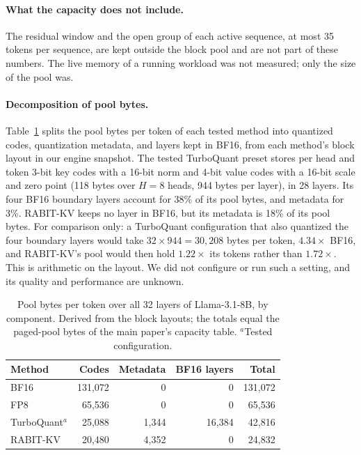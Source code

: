 \documentclass{article}
\begin{document}
\paragraph{What the capacity does not include.}
The residual window and the open group of each active sequence, at most 35 tokens per sequence, are
kept outside the block pool and are not part of these numbers. The live memory of a running workload
was not measured; only the size of the pool was.

\paragraph{Decomposition of pool bytes.}
Table~\ref{tab:app-decomp} splits the pool bytes per token of each tested method into quantized codes,
quantization metadata, and layers kept in BF16, from each method's block layout in our engine
snapshot. The tested TurboQuant preset stores per head and token 3-bit key codes with a 16-bit norm
and 4-bit value codes with a 16-bit scale and zero point (118 bytes over $H{=}8$ heads, 944 bytes per
layer), in 28 layers. Its four BF16 boundary layers account for 38\% of its pool bytes, and metadata
for 3\%. RABIT-KV keeps no layer in BF16, but its metadata is 18\% of its pool bytes. For comparison
only: a TurboQuant configuration that also quantized the four boundary layers would take
$32 \times 944 = 30{,}208$ bytes per token, $4.34\times$ BF16, and RABIT-KV's pool would then hold
$1.22\times$ its tokens rather than $1.72\times$. This is arithmetic on the layout. We did not configure
or run such a setting, and its quality and performance are unknown.

\begin{table}[h]
\centering
\small
\setlength{\tabcolsep}{3.5pt}
\begin{tabular}{@{}lrrrr@{}}
\toprule
Method & Codes & Metadata & BF16 layers & Total \\
\midrule
BF16 & 131,072 & 0 & 0 & 131,072 \\
FP8 & 65,536 & 0 & 0 & 65,536 \\
TurboQuant$^{a}$ & 25,088 & 1,344 & 16,384 & 42,816 \\
RABIT-KV & 20,480 & 4,352 & 0 & 24,832 \\
\bottomrule
\end{tabular}
\caption{Pool bytes per token over all 32 layers of Llama-3.1-8B, by component. Derived from the
block layouts; the totals equal the paged-pool bytes of the main paper's capacity table. $^{a}$Tested
configuration.}
\label{tab:app-decomp}
\end{table}
\end{document}
